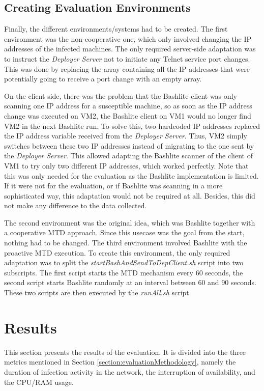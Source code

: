\subsection{Creating Evaluation Environments}
Finally, the different environments/systems had to be created. The first environment was the non-cooperative one, which only involved changing the IP addresses of the infected machines. 
The only required server-side adaptation was to instruct the \textit{Deployer Server} not to initiate any Telnet service port changes. This was done by replacing the array containing all the IP addresses that were potentially going to receive a port change with an empty array. 

On the client side, there was the problem that the Bashlite client was only scanning one IP address for a susceptible machine, so as soon as the IP address change was executed on VM2, the Bashlite client on VM1 would no longer find VM2 in the next Bashlite run. To solve this, two hardcoded IP addresses replaced the IP address variable received from the \textit{Deployer Server}. Thus, VM2 simply switches between these two IP addresses instead of migrating to the one sent by the \textit{Deployer Server}. This allowed adapting the Bashlite scanner of the client of VM1 to try only two different IP addresses, which worked perfectly. Note that this was only needed for the evaluation as the Bashlite implementation is limited. If it were not for the evaluation, or if Bashlite was scanning in a more sophisticated way, this adaptation would not be required at all. Besides, this did not make any difference to the data collected.

The second environment was the original idea, which was Bashlite together with a cooperative MTD approach. Since this usecase was the goal from the start, nothing had to be changed. The third environment involved Bashlite with the proactive MTD execution. To create this environment, the only required adaptation was to split the \textit{startBashAndSendToDepClient.sh} script into two subscripts. The first script starts the MTD mechanism every 60 seconds, the second script starts Bashlite randomly at an interval between 60 and 90 seconds. These two scripts are then executed by the \textit{runAll.sh} script. 




\section{Results} \label{section:results}
This section presents the results of the evaluation. It is divided into the three metrics mentioned in Section \ref{section:evaluationMethodology}, namely the duration of infection activity in the network, the interruption of availability, and the CPU/RAM usage. 

